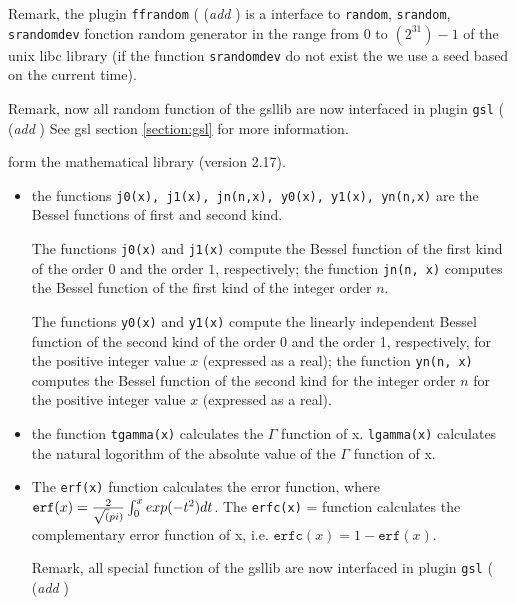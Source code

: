 \documentclass[a4paper,twoside,12pt]{book}
\begin{document}
\begin{description}
Remark, the plugin \texttt{ffrandom} ( ({\it add }) is a interface to   \texttt{random}, \texttt{srandom}, \texttt{srandomdev} fonction random generator
in the range from $0$ to $(2^{31})-1$ of the unix libc library 
  (if the function \texttt{srandomdev} do not exist the we use a seed based on the current time).
 
Remark,  now all random function of the gsllib are now interfaced in plugin \texttt{gsl} ( ({\it add })
See gsl section \ref{section:gsl} for more information. 


  form the mathematical library (version 2.17).
\begin{itemize}
\item the functions \texttt{j0(x), j1(x), jn(n,x), y0(x), y1(x), yn(n,x)} are the Bessel functions of first and second kind.

    The functions \texttt{j0(x)} and \texttt{j1(x)} compute the Bessel function of the first
     kind of the order $0$ and the order $1$, respectively; the function \texttt{jn(n, x)}
     computes the Bessel function of the first kind of the integer order $n$.

     The functions \texttt{y0(x)} and \texttt{y1(x)} compute the linearly independent Bessel
     function of the second kind of the order 0 and the order 1, respectively,
     for the positive integer value $x$ (expressed as a real); the function
     \texttt{yn(n, x)} computes the Bessel function of the second kind for the integer
     order $n$ for the positive integer value $x$ (expressed as a real).

\item   the function  \texttt{tgamma(x)} calculates the $\Gamma$ function of x.  \texttt{lgamma(x)} calculates the
     natural logorithm of the absolute value of the $\Gamma$ function of x.
\item       The \texttt{erf(x)} function calculates the error function,  where
      $     \mathtt{erf}(x) = {2\over \sqrt(pi)}\int_0^x   exp(-t^2) dt$.
     The \texttt{erfc(x)} = function calculates the complementary error function of x, i.e.
     $ \mathtt{erfc}(x)= 1- \mathtt{erf}(x) $.


Remark, all special function of the gsllib are now interfaced in plugin \texttt{gsl} ( ({\it add })

\end{itemize}

\end{description}
\end{document}
